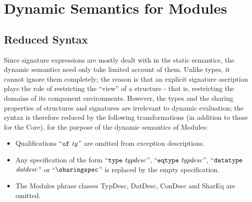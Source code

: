 \section{Dynamic Semantics for Modules}
\label{dynmod-sec}
\subsection{Reduced Syntax}
Since signature expressions
are mostly dealt with in the static semantics,
the dynamic semantics need only take limited account of them.  Unlike types,
it cannot ignore them completely; the reason is that an explicit signature
ascription plays the role of restricting the ``view'' of a structure - that is,
restricting the domains of its component environments.  However, the types
and the sharing properties of structures and signatures are irrelevant to
dynamic evaluation; the syntax is therefore
reduced by the following transformations (in addition to those for the Core),
for the purpose of the dynamic semantics of Modules:
\begin{itemize}
\item Qualifications ``${\tt of}\ {\it ty}$'' are omitted from exception descriptions.
\item Any specification of the form ``$\mbox{{\tt type}\ {\it typdesc}}$'', ``$\mbox{{\tt eqtype}\ {\it typdesc}}$'',
``${\tt datatype}$\ ${\it datdesc}$'' or
``$\sharingspec$'' is replaced by the empty specification.
\item The Modules phrase classes TypDesc, DatDesc, ConDesc and SharEq
      are omitted.
\end{itemize}


